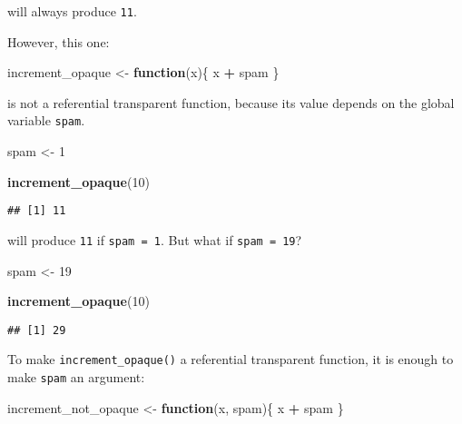 \documentclass[
]{article}
\newenvironment{Shaded}{\begin{snugshade}}{\end{snugshade}}
\newcommand{\ControlFlowTok}[1]{\textcolor[rgb]{0.13,0.29,0.53}{\textbf{#1}}}
\newcommand{\DecValTok}[1]{\textcolor[rgb]{0.00,0.00,0.81}{#1}}
\newcommand{\KeywordTok}[1]{\textcolor[rgb]{0.13,0.29,0.53}{\textbf{#1}}}
\newcommand{\NormalTok}[1]{#1}
\newcommand{\OperatorTok}[1]{\textcolor[rgb]{0.81,0.36,0.00}{\textbf{#1}}}
\newcommand{\StringTok}[1]{\textcolor[rgb]{0.31,0.60,0.02}{#1}}
\begin{document}
will always produce \texttt{11}.

However, this one:

\begin{Shaded}
\begin{Highlighting}[]
\NormalTok{increment\_opaque \textless{}{-}}\StringTok{ }\ControlFlowTok{function}\NormalTok{(x)\{}
\NormalTok{    x }\OperatorTok{+}\StringTok{ }\NormalTok{spam}
\NormalTok{\}}
\end{Highlighting}
\end{Shaded}

is not a referential transparent function, because its value depends on the global variable \texttt{spam}.

\begin{Shaded}
\begin{Highlighting}[]
\NormalTok{spam \textless{}{-}}\StringTok{ }\DecValTok{1}

\KeywordTok{increment\_opaque}\NormalTok{(}\DecValTok{10}\NormalTok{)}
\end{Highlighting}
\end{Shaded}

\begin{verbatim}
## [1] 11
\end{verbatim}

will produce \texttt{11} if \texttt{spam\ =\ 1}. But what if \texttt{spam\ =\ 19}?

\begin{Shaded}
\begin{Highlighting}[]
\NormalTok{spam \textless{}{-}}\StringTok{ }\DecValTok{19}

\KeywordTok{increment\_opaque}\NormalTok{(}\DecValTok{10}\NormalTok{)}
\end{Highlighting}
\end{Shaded}

\begin{verbatim}
## [1] 29
\end{verbatim}

To make \texttt{increment\_opaque()} a referential transparent function, it is enough to make \texttt{spam} an
argument:

\begin{Shaded}
\begin{Highlighting}[]
\NormalTok{increment\_not\_opaque \textless{}{-}}\StringTok{ }\ControlFlowTok{function}\NormalTok{(x, spam)\{}
\NormalTok{    x }\OperatorTok{+}\StringTok{ }\NormalTok{spam}
\NormalTok{\}}
\end{Highlighting}
\end{Shaded}
\end{document}
